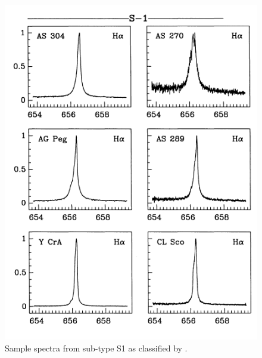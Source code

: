 \begin{figure}[!htb]
\centering
\includegraphics[scale=0.75]{figures/van winckel class.png}
\caption{Sample spectra from sub-type S1 as classified by \citet{van1993atlas}.}
\end{figure}

